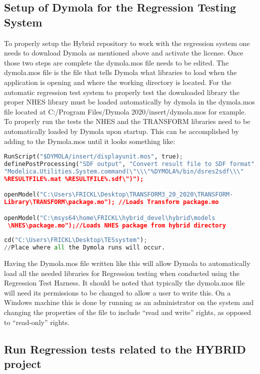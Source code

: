 \subsection{Setup of Dymola for the Regression Testing System}
To properly setup the Hybrid repository to work with the regression system one needs to download Dymola as mentioned above and activate the license. Once those two steps are complete the dymola.mos file needs to be edited. The dymola.mos file is the file that tells Dymola what libraries to load when the application is opening and where the working directory is located. For the automatic regression test system to properly test the downloaded library the proper NHES library must be loaded automatically by dymola in the dymola.mos file located at C:/Program Files/Dymola 2020/insert/dymola.mos for example. To properly run the tests the NHES and the TRANSFORM libraries need to be automatically loaded by Dymola upon startup. This can be accomplished by adding to the Dymola.mos until it looks something like:
\begin{lstlisting}[language=python, basicstyle=\small]
RunScript("$DYMOLA/insert/displayunit.mos", true);
definePostProcessing("SDF output", "Convert result file to SDF format", 
"Modelica.Utilities.System.command(\"\\\"%DYMOLA%/bin/dsres2sdf\\\" 
%RESULTFILE%.mat %RESULTFILE%.sdf\")");

openModel("C:\Users\FRICKL\Desktop\TRANSFORM3_20_2020\TRANSFORM- 
Library\TRANSFORM\package.mo"); //Loads Transform package.mo

openModel("C:\msys64\home\FRICKL\hybrid_devel\hybrid\models 
 \NHES\package.mo");//Loads NHES package from hybrid directory
 
cd("C:\Users\FRICKL\Desktop\TESsystem"); 
//Place where all the Dymola runs will occur.
\end{lstlisting}

Having the Dymola.mos file written like this will allow Dymola to automatically load all the needed libraries for Regression testing when conducted using the Regression Test Harness. It should be noted that typically the dymola.mos file will need its permissions to be changed to allow a user to write this. On a Windows machine this is done by running as an administrator on the system and changing the properties of the file to include “read and write” rights, as opposed to “read-only” rights. 

\subsection{Run Regression tests related to the HYBRID project}

